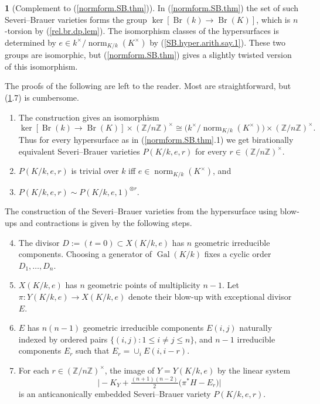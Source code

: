 \documentclass{amsart}
\theoremstyle{definition}
\newtheorem{say}[thm]{}
\theoremstyle{remark}
\newcommand{\z}[0]{{\mathbb Z}}
\newcommand{\gal}[0]{\operatorname{Gal}}
\newcommand{\br}[0]{\operatorname{Br}}
\newcommand{\norm}[0]{\operatorname{norm}}
\begin{document}
\begin{say}[Complement to (\ref{normform.SB.thm})]\label{normform.SB.thm.compl}
In (\ref{normform.SB.thm})
    the set of such Severi--Brauer varieties forms the group
$\ker[\br(k)\to \br(K)]$, which is $n$-torsion by (\ref{rel.br.dp.lem}).
The isomorphism classes of the  hypersurfaces is determined by
$e\in k^{\times}/\norm_{K/k}(K^{\times})$ by  (\ref{SB.hyper.arith.say.1}).
These two groups are isomorphic, but (\ref{normform.SB.thm}) gives a slightly twisted version of this isomorphism.

The proofs of the following  are left to the reader. Most are straightforward, but (\ref{normform.SB.thm.compl}.7) is cumbersome.
\begin{enumerate} %
\item The construction gives  an isomorphism
$$
\ker[\br(k)\to \br(K)]\times (\z/n\z)^\times\cong 
\bigl(k^{\times}/\norm_{K/k}(K^{\times})\bigr)\times (\z/n\z)^\times.
$$
Thus
for every  hypersurface  as in (\ref{normform.SB.thm}.1) we get birationally equivalent
 Severi--Brauer varieties $P(K/k, e,r)$ for every $r\in (\z/n\z)^{\times}$.
\item  $P(K/k, e,r)$ is trivial over $k$ iff 
$e\in\norm_{K/k}(K^{\times})$, and 
\item $P(K/k, e, r)\sim P(K/k, e, 1)^{\otimes r}$.
\end{enumerate}
The construction of the Severi--Brauer varieties from the
hypersurface using blow-ups and contractions is given by the following steps.
\begin{enumerate}\setcounter{enumi}{3}
\item The divisor $D:= (t=0)\subset X(K/k, e)$ has $n$  geometric irreducible components. Choosing a generator of $\gal(K/k)$  fixes a cyclic order  
$D_1, \dots, D_n$.
\item $X(K/k, e)$ has $n$ geometric points of multiplicity $n-1$.
Let $\pi:Y(K/k, e)\to X(K/k, e)$ denote their blow-up
with exceptional divisor $E$.
\item $E$ has $n(n-1)$ geometric irreducible components $E(i,j)$ naturally indexed by
ordered pairs $\{(i,j): 1\leq i\neq j\leq n\}$, and $n-1$  irreducible components 
$E_r$ such that $E_r=\cup_iE(i,i-r)$.
\item For each  $r\in (\z/n\z)^{\times}$, the image of $Y=Y(K/k, e)$ by the linear system
$$
\bigl|-K_Y+\tfrac{(n+1)(n-2)}{2}\bigl(\pi^*H - E_r\bigr)\bigr|
$$
is an anticanonically embedded  Severi--Brauer variety $P(K/k, e, r)$.
\end{enumerate}

\end{say}
\end{document}
